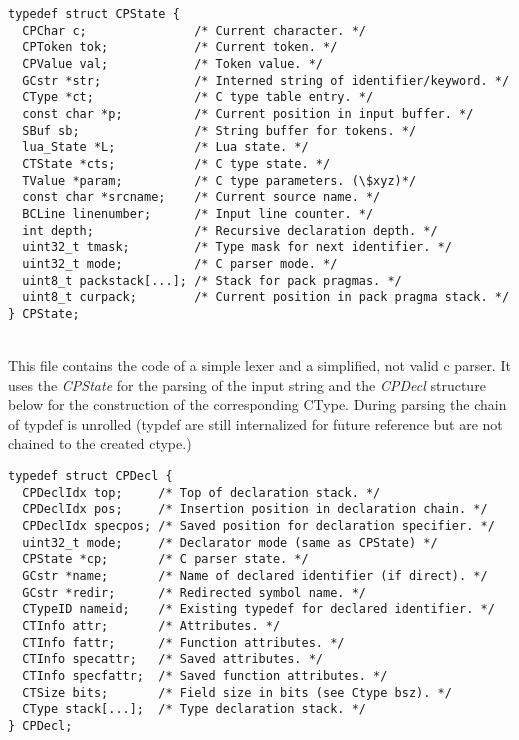 \begin{adjustbox}{bgcolor=backgroundColour, max width=\textwidth}
\begin{lstlisting}[style=CStyle]
typedef struct CPState {
  CPChar c;               /* Current character. */
  CPToken tok;            /* Current token. */
  CPValue val;            /* Token value. */
  GCstr *str;             /* Interned string of identifier/keyword. */
  CType *ct;              /* C type table entry. */
  const char *p;          /* Current position in input buffer. */
  SBuf sb;                /* String buffer for tokens. */
  lua_State *L;           /* Lua state. */
  CTState *cts;           /* C type state. */
  TValue *param;          /* C type parameters. (\$xyz)*/
  const char *srcname;    /* Current source name. */
  BCLine linenumber;      /* Input line counter. */
  int depth;              /* Recursive declaration depth. */
  uint32_t tmask;         /* Type mask for next identifier. */
  uint32_t mode;          /* C parser mode. */
  uint8_t packstack[...]; /* Stack for pack pragmas. */
  uint8_t curpack;        /* Current position in pack pragma stack. */
} CPState;
\end{lstlisting}
\end{adjustbox}
\\
This file contains the code of a simple lexer and a simplified, not valid c
parser. It uses the \emph{CPState} for the parsing of the input
string and the \emph{CPDecl} structure below for the construction of the
corresponding CType. During parsing the chain of typdef is unrolled (typdef are
still internalized for future reference but are not chained to the created
ctype.)
\begin{lstlisting}[style=CStyle]
typedef struct CPDecl {
  CPDeclIdx top;     /* Top of declaration stack. */
  CPDeclIdx pos;     /* Insertion position in declaration chain. */
  CPDeclIdx specpos; /* Saved position for declaration specifier. */
  uint32_t mode;     /* Declarator mode (same as CPState) */
  CPState *cp;       /* C parser state. */
  GCstr *name;       /* Name of declared identifier (if direct). */
  GCstr *redir;      /* Redirected symbol name. */
  CTypeID nameid;    /* Existing typedef for declared identifier. */
  CTInfo attr;       /* Attributes. */
  CTInfo fattr;      /* Function attributes. */
  CTInfo specattr;   /* Saved attributes. */
  CTInfo specfattr;  /* Saved function attributes. */
  CTSize bits;       /* Field size in bits (see Ctype bsz). */
  CType stack[...];  /* Type declaration stack. */
} CPDecl;
\end{lstlisting}
